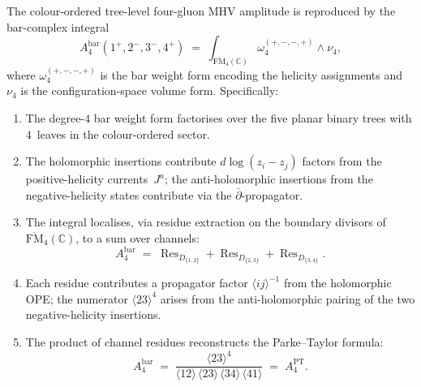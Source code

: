 \begin{theorem}[MHV amplitude from the bar-complex integral at $n = 4$; \ClaimStatusProvedHere]
\label{thm:cbt-mhv-bar-integral}
The colour-ordered tree-level four-gluon MHV amplitude is reproduced by the bar-complex integral
\[
A_4^{\mathrm{bar}}(1^+, 2^-, 3^-, 4^+)
\;=\;
\int_{\overline{\mathrm{FM}}_4(\mathbb{C})}
\omega_4^{(+,-,-,+)} \wedge \nu_4,
\]
where $\omega_4^{(+,-,-,+)}$ is the bar weight form encoding the helicity assignments and $\nu_4$ is the configuration-space volume form. Specifically:
\begin{enumerate}[label=\textup{(\alph*)}]
\item The degree-$4$ bar weight form factorises over the five planar binary trees with $4$~leaves in the colour-ordered sector.
\item The holomorphic insertions contribute $d\log(z_i - z_j)$ factors from the positive-helicity currents~$J^a$; the anti-holomorphic insertions from the negative-helicity states contribute via the $\bar\partial$-propagator.
\item The integral localises, via residue extraction on the boundary divisors of $\overline{\mathrm{FM}}_4(\mathbb{C})$, to a sum over channels:
\[
A_4^{\mathrm{bar}}
\;=\;
\operatorname{Res}_{D_{\{1,2\}}} + \operatorname{Res}_{D_{\{2,3\}}} + \operatorname{Res}_{D_{\{3,4\}}}.
\]
\item Each residue contributes a propagator factor $\langle ij\rangle^{-1}$ from the holomorphic OPE; the numerator $\langle 23\rangle^4$ arises from the anti-holomorphic pairing of the two negative-helicity insertions.
\item The product of channel residues reconstructs the Parke--Taylor formula:
\[
A_4^{\mathrm{bar}}
\;=\;
\frac{\langle 23\rangle^4}
 {\langle 12\rangle\,\langle 23\rangle\,
 \langle 34\rangle\,\langle 41\rangle}
\;=\; A_4^{\mathrm{PT}}.
\]
\end{enumerate}
\end{theorem}

